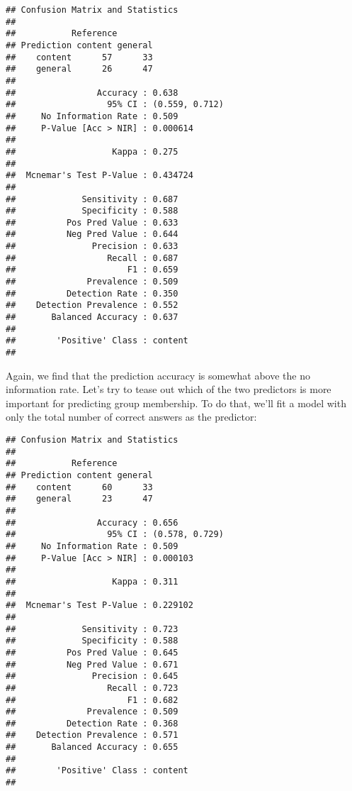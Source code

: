 \documentclass[11pt,]{article}
\begin{document}
\begin{verbatim}
## Confusion Matrix and Statistics
## 
##           Reference
## Prediction content general
##    content      57      33
##    general      26      47
##                                         
##                Accuracy : 0.638         
##                  95% CI : (0.559, 0.712)
##     No Information Rate : 0.509         
##     P-Value [Acc > NIR] : 0.000614      
##                                         
##                   Kappa : 0.275         
##                                         
##  Mcnemar's Test P-Value : 0.434724      
##                                         
##             Sensitivity : 0.687         
##             Specificity : 0.588         
##          Pos Pred Value : 0.633         
##          Neg Pred Value : 0.644         
##               Precision : 0.633         
##                  Recall : 0.687         
##                      F1 : 0.659         
##              Prevalence : 0.509         
##          Detection Rate : 0.350         
##    Detection Prevalence : 0.552         
##       Balanced Accuracy : 0.637         
##                                         
##        'Positive' Class : content       
## 
\end{verbatim}

Again, we find that the prediction accuracy is somewhat above the no
information rate. Let's try to tease out which of the two predictors is
more important for predicting group membership. To do that, we'll fit a
model with only the total number of correct answers as the predictor:

\begin{verbatim}
## Confusion Matrix and Statistics
## 
##           Reference
## Prediction content general
##    content      60      33
##    general      23      47
##                                         
##                Accuracy : 0.656         
##                  95% CI : (0.578, 0.729)
##     No Information Rate : 0.509         
##     P-Value [Acc > NIR] : 0.000103      
##                                         
##                   Kappa : 0.311         
##                                         
##  Mcnemar's Test P-Value : 0.229102      
##                                         
##             Sensitivity : 0.723         
##             Specificity : 0.588         
##          Pos Pred Value : 0.645         
##          Neg Pred Value : 0.671         
##               Precision : 0.645         
##                  Recall : 0.723         
##                      F1 : 0.682         
##              Prevalence : 0.509         
##          Detection Rate : 0.368         
##    Detection Prevalence : 0.571         
##       Balanced Accuracy : 0.655         
##                                         
##        'Positive' Class : content       
## 
\end{verbatim}
\end{document}
